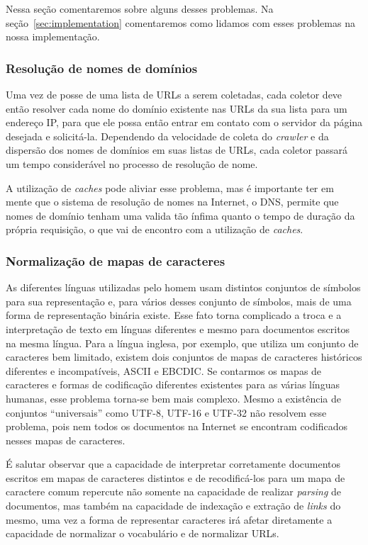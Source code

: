 \documentclass[10pt,twocolumn]{article}
\begin{document}
Nessa seção comentaremos sobre alguns desses problemas. Na
seção~\ref{sec:implementation} comentaremos como lidamos com esses
problemas na nossa implementação.

\subsubsection{Resolução de nomes de domínios}\label{prob:dns}
Uma vez de posse de uma lista de URLs a serem coletadas, cada coletor
deve então resolver cada nome do domínio existente nas URLs da sua lista
para um endereço IP, para que ele possa então entrar em contato com o
servidor da página desejada e solicitá-la. Dependendo da velocidade de
coleta do \emph{crawler} e da dispersão dos nomes de domínios em suas
listas de URLs, cada coletor passará um tempo considerável no processo de
resolução de nome.

A utilização de \emph{caches} pode aliviar esse problema, mas é
importante ter em mente que o sistema de resolução de nomes na Internet,
o DNS, permite que nomes de domínio tenham uma valida tão ínfima quanto
o tempo de duração da própria requisição, o que vai de encontro com a
utilização de \emph{caches}.

\subsubsection{Normalização de mapas de
caracteres}\label{prob:charmapnorm}

As diferentes línguas utilizadas pelo homem usam distintos conjuntos de
símbolos para sua representação e, para vários desses conjunto de
símbolos, mais de uma forma de representação binária existe. Esse fato
torna complicado a troca e a interpretação de texto em línguas diferentes
e mesmo para documentos escritos na mesma língua. Para a língua inglesa,
por exemplo, que utiliza um conjunto de caracteres bem limitado, existem
dois conjuntos de mapas de caracteres históricos diferentes e
incompatíveis, ASCII e EBCDIC. Se contarmos os mapas de caracteres e
formas de codificação diferentes existentes para as várias línguas
humanas, esse problema torna-se bem mais complexo.
Mesmo a existência de conjuntos ``universais'' como UTF-8, UTF-16 e
UTF-32 não resolvem esse problema, pois nem todos os documentos na
Internet se encontram codificados nesses mapas de caracteres.

É salutar observar que a capacidade de interpretar corretamente
documentos escritos em mapas de caracteres distintos e de recodificá-los
para um mapa de caractere comum  repercute não somente na capacidade de
realizar \emph{parsing} de documentos, mas também na capacidade de
indexação e extração de \emph{links} do mesmo, uma vez a forma de
representar caracteres irá afetar diretamente a capacidade de
normalizar o vocabulário e de normalizar URLs.
\end{document}
